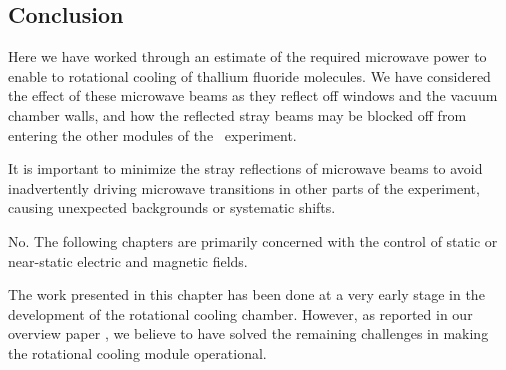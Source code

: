 \subsection{Conclusion}


Here we have worked through an estimate of the required microwave power to
enable to rotational cooling of thallium fluoride molecules. We have considered
the effect of these microwave beams as they reflect off windows and the vacuum
chamber walls, and how the reflected stray beams may be blocked off from
entering the other modules of the \CENTREX\ experiment.


It is important to minimize the stray reflections of microwave beams to avoid
inadvertently driving microwave transitions in other parts of the experiment,
causing unexpected backgrounds or systematic shifts.


No. The following chapters are primarily concerned with the control of static or
near-static electric and magnetic fields.


The work presented in this chapter has been done at a very early stage in the
development of the rotational cooling chamber. However, as reported in our
overview paper \cite{grasdijk2021centrex}, we believe to have solved the
remaining challenges in making the rotational cooling module operational.
